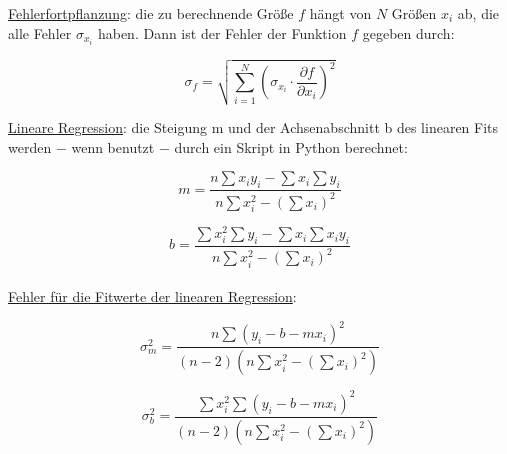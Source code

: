     \underline{Fehlerfortpflanzung}: die zu berechnende Größe $f$ hängt von $N$ Größen $x_i$ ab, die alle
    Fehler $\sigma_{x_i}$ haben. Dann ist der Fehler der Funktion $f$ gegeben durch:

    \begin{equation}
        \sigma_f = \sqrt{\sum_{i=1}^{N}\left(\sigma_{x_i} \cdot \frac{\partial f}{\partial x_i}\right)^2}
        \label{eq:gaussfehlerfort}
    \end{equation}

\newpage

    \underline{Lineare Regression}: die Steigung m und der Achsenabschnitt b des linearen Fits werden $-$ wenn 
    benutzt $-$ durch ein Skript in Python berechnet:

    \begin{equation}
        m = \frac{n \sum x_i y_i - \sum x_i \sum y_i}{n \sum x_i^2 - (\sum x_i)^2}
        \label{eq:mlinregression}
    \end{equation}

    \begin{equation}
        b = \frac{\sum x_i^2 \sum y_i - \sum x_i \sum x_i y_i}{n \sum x_i^2 - (\sum x_i)^2}
        \label{eq:blinregression}
    \end{equation}
    \\

    \underline{Fehler für die Fitwerte der linearen Regression}:

    \begin{equation}
        \sigma_m^2 = \frac{n \sum (y_i - b - mx_i)^2}{(n-2)(n \sum x_i^2 - (\sum x_i)^2)}
        \label{eq:mlinregfehler}
    \end{equation}

    \begin{equation}
        \sigma_b^2 = \frac{\sum x_i^2 \sum (y_i - b - mx_i)^2}{(n-2)(n \sum x_i^2 -(\sum x_i)^2)}
        \label{eq:blinregfehler}
    \end{equation}